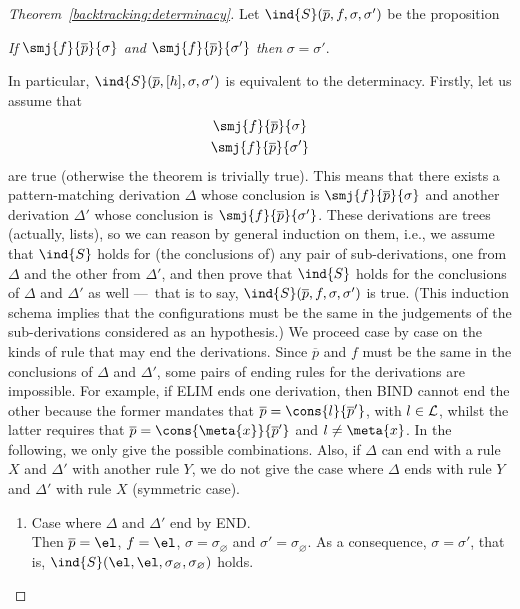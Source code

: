 \begin{proof}[Theorem~\ref{backtracking:determinacy}] Let
  \(\ind{S}(\overline{p}, f, \sigma, \sigma')\) be the proposition
\begin{center}
\emph{If} \(\smj{f}{\overline{p}}{\sigma}\) 
\emph{and} \(\smj{f}{\overline{p}}{\sigma'}\)
\emph{then} \(\sigma = \sigma'\).
\end{center}
In particular, \(\ind{S}(\overline{p}, [h], \sigma, \sigma')\) is
equivalent to the determinacy. Firstly, let us assume that
\begin{gather}
\smj{f}{\overline{p}}{\sigma} \label{x:deter:delta}\\
\smj{f}{\overline{p}}{\sigma'} \label{x:deter:delta'}
\end{gather}
are true (otherwise the theorem is trivially true). This means that
there exists a pattern\hyp{}matching derivation \(\Delta\) whose
conclusion is \(\smj{f}{\overline{p}}{\sigma}\) and another derivation
\(\Delta'\) whose conclusion is
\(\smj{f}{\overline{p}}{\sigma'}\). These derivations are trees
(actually, lists), so we can reason by general induction on them,
i.e., we assume that \(\ind{S}\) holds for (the conclusions of) any
pair of sub\hyp{}derivations, one from \(\Delta\) and the other from
\(\Delta'\), and then prove that \(\ind{S}\) holds for the conclusions
of \(\Delta\) and \(\Delta'\) as well ---~that is to say,
\(\ind{S}(\overline{p}, f, \sigma, \sigma')\) is true. (This induction
schema implies that the configurations must be the same in the
judgements of the sub\hyp{}derivations considered as an hypothesis.)
We proceed case by case on the kinds of rule that may end the
derivations. Since \(\overline{p}\) and \(f\) must be the same in the
conclusions of \(\Delta\) and \(\Delta'\), some pairs of ending rules
for the derivations are impossible. For example, if \textsf{ELIM} ends
one derivation, then \textsf{BIND} cannot end the other because the
former mandates that \(\overline{p} = \cons{l}{\overline{p}'}\), with
\(l \in {\cal L}\), whilst the latter requires that \(\overline{p} =
\cons{\meta{x}}{\overline{p}'}\) and \(l \neq \meta{x}\). In the
following, we only give the possible combinations. Also, if \(\Delta\)
can end with a rule \(X\) and \(\Delta'\) with another rule \(Y\), we
do not give the case where \(\Delta\) ends with rule \(Y\) and
\(\Delta'\) with rule \(X\) (symmetric case).
\begin{enumerate}

  \item Case where \(\Delta\) and \(\Delta'\) end by \textsf{END}.\\
    Then \(\overline{p} = \el\), \(f = \el\), \(\sigma =
    \sigma_\varnothing\) and \(\sigma' = \sigma_\varnothing\). As a
    consequence, \(\sigma = \sigma'\), that is, \(\ind{S}(\el, \el,
    \sigma_\varnothing, \sigma_\varnothing)\) holds.


\end{enumerate}
\end{proof}

